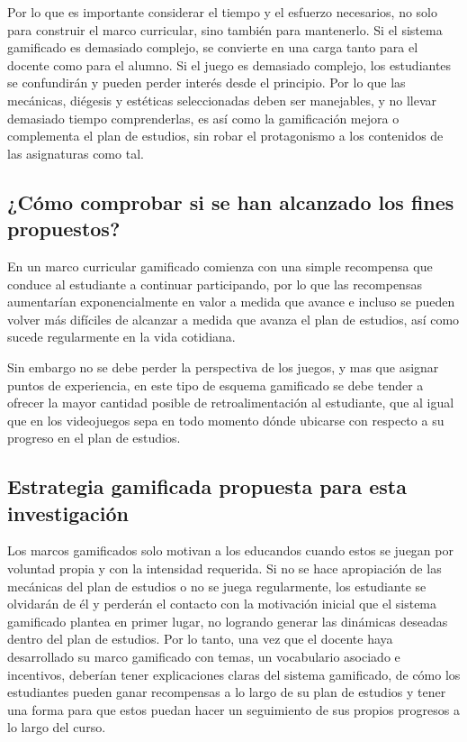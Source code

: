 Por lo que es importante considerar el tiempo y el esfuerzo necesarios, no solo para construir el marco 
curricular, sino también para mantenerlo. Si el sistema gamificado es demasiado complejo, se convierte en una 
carga tanto para el docente como para el alumno. Si el juego es demasiado complejo, los estudiantes se 
confundirán y pueden perder interés desde el principio. Por lo que las mecánicas, diégesis y estéticas 
seleccionadas deben ser manejables, y no llevar demasiado tiempo comprenderlas, es así como la gamificación 
mejora o complementa el plan de estudios, sin robar el protagonismo a los contenidos de las asignaturas como 
tal.

\subsection{¿Cómo comprobar si se han alcanzado los fines propuestos?}

En un marco curricular gamificado comienza con una simple recompensa que conduce al estudiante a continuar 
participando, por lo que las recompensas aumentarían exponencialmente en valor a medida que avance e incluso
se pueden volver más difíciles de alcanzar a medida que avanza el plan de estudios, así como sucede 
regularmente en la vida cotidiana.

Sin embargo no se debe perder la perspectiva de los juegos, y mas que asignar puntos de experiencia, en este 
tipo de esquema gamificado se debe tender a ofrecer la mayor cantidad posible de retroalimentación al 
estudiante, que al igual que en los videojuegos sepa en todo momento dónde ubicarse con respecto a su progreso 
en el plan de estudios.

\subsection{Estrategia gamificada propuesta para esta investigación}

Los marcos gamificados solo motivan a los educandos cuando estos se juegan por voluntad propia y con la 
intensidad requerida. Si no se hace apropiación de las mecánicas del plan de estudios o no se juega 
regularmente, los estudiante se olvidarán de él y perderán el contacto con la motivación inicial que el 
sistema gamificado plantea en primer lugar, no logrando generar las dinámicas deseadas dentro del plan de 
estudios. Por lo tanto, una vez que el docente haya desarrollado su marco gamificado con temas, un vocabulario 
asociado e incentivos, deberían tener explicaciones claras del sistema gamificado, de cómo los estudiantes 
pueden ganar recompensas a lo largo de su plan de estudios y tener una forma para que estos puedan hacer un 
seguimiento de sus propios progresos a lo largo del curso.

